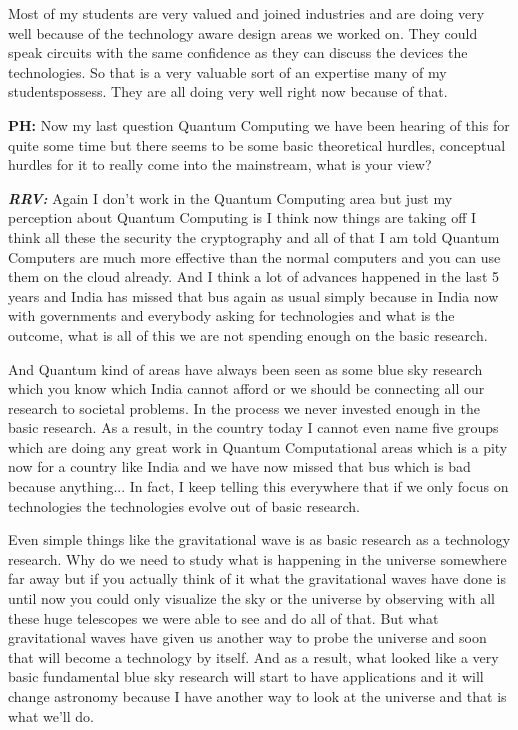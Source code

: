 \begin{multicols}{2}
Most of my students are very valued and joined industries and are doing very well because of the technology aware design areas we worked on. They could speak circuits with the same confidence as they can discuss the devices the technologies. So that is a very valuable sort of an expertise many of my studentspossess. They are all doing very well right now because of that.

\textbf{PH:} Now my last question Quantum Computing we have been hearing of this for quite some time but there seems to be some basic theoretical hurdles, conceptual hurdles for it to really come into the mainstream, what is your view?

\textbf{\textit{RRV:}} Again I don’t work in the Quantum Computing area but just my perception about Quantum Computing is I think now things are taking off I think all these the security the cryptography and all of that I am told Quantum Computers are much more effective than the normal computers and you can use them on the cloud already. And I think a lot of advances happened in the last 5 years and India has missed that bus again as usual simply because in India now with governments and everybody asking for technologies and what is the outcome, what is all of this we are not spending enough on the basic research.

And Quantum kind of areas have always been seen as some blue sky research which you know which India cannot afford or we should be connecting all our research to societal problems. In the process we never invested enough in the basic research. As a result, in the country today I cannot even name five groups which are doing any great work in Quantum Computational areas which is a pity now for a country like India and we have now missed that bus which is bad because anything... In fact, I keep telling this everywhere that if we only focus on technologies the technologies evolve out of basic research.

Even simple things like the gravitational wave is as basic research as a technology research. Why do we need to study what is happening in the universe somewhere far away but if you actually think of it what the gravitational waves have done is until now you could only visualize the sky or the universe by observing with all these huge telescopes we were able to see and do all of that. But what gravitational waves have given us another way to probe the universe and soon that will become a technology by itself. And as a result, what looked like a very basic fundamental blue sky research will start to have applications and it will change astronomy because I have another way to look at the universe and that is what we’ll do.


\end{multicols}
